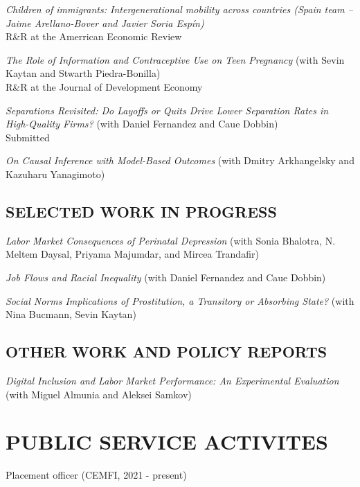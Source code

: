 \documentclass[margin]{res} %
\newcommand{\rootFolder}{/Users/tomzohar/Dropbox/}
\begin{document}
\begin{resume}
\textit{Children of immigrants: Intergenerational mobility across countries (Spain team -- Jaime Arellano-Bover and Javier Soria Espín)}\\
R\&R at the Amerrican Economic Review

%

\textit{The Role of Information and Contraceptive Use on Teen Pregnancy} (with Sevin Kaytan and Stwarth Piedra-Bonilla) \\
R\&R at the Journal of Development Economy

\textit{Separations Revisited: Do Layoffs or Quits Drive Lower Separation Rates in High-Quality Firms?} (with Daniel Fernandez and Caue Dobbin) \\
Submitted

\textit{On Causal Inference with Model-Based Outcomes} (with Dmitry Arkhangelsky and Kazuharu Yanagimoto)

\subsection{SELECTED WORK IN PROGRESS}

\textit{Labor Market Consequences of Perinatal Depression} (with Sonia Bhalotra, N. Meltem Daysal, Priyama Majumdar, and Mircea Trandafir) 

\textit{Job Flows and Racial Inequality} (with Daniel Fernandez and Caue Dobbin) 

\textit{Social Norms Implications of Prostitution, a Transitory or Absorbing State?} (with Nina Bucmann, Sevin Kaytan)

\subsection{OTHER WORK AND POLICY REPORTS}

\textit{Digital Inclusion and Labor Market Performance: An Experimental Evaluation} (with Miguel Almunia and Aleksei Samkov)

\section{PUBLIC SERVICE ACTIVITES} 

Placement officer (CEMFI, 2021 - present)


\end{resume}
\end{document}
